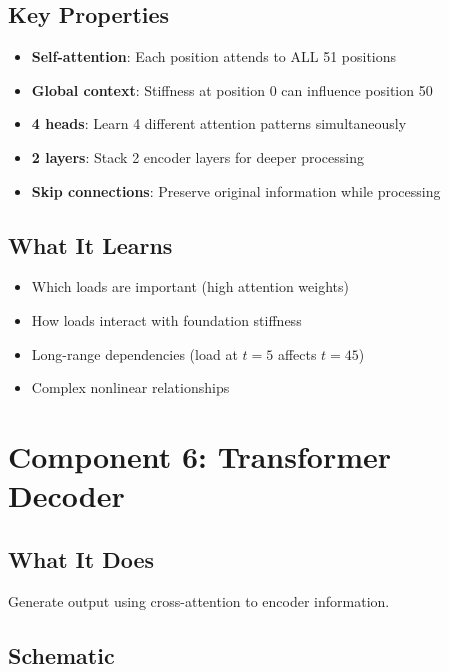 \documentclass[11pt,a4paper]{article}
\begin{document}
\subsection{Key Properties}

\begin{itemize}
  \item \textbf{Self-attention}: Each position attends to ALL 51 positions
  \item \textbf{Global context}: Stiffness at position 0 can influence position 50
  \item \textbf{4 heads}: Learn 4 different attention patterns simultaneously
  \item \textbf{2 layers}: Stack 2 encoder layers for deeper processing
  \item \textbf{Skip connections}: Preserve original information while processing
\end{itemize}

\subsection{What It Learns}

\begin{itemize}
  \item Which loads are important (high attention weights)
  \item How loads interact with foundation stiffness
  \item Long-range dependencies (load at $t=5$ affects $t=45$)
  \item Complex nonlinear relationships
\end{itemize}

\section{Component 6: Transformer Decoder}

\subsection{What It Does}

Generate output using cross-attention to encoder information.

\subsection{Schematic}
\end{document}
